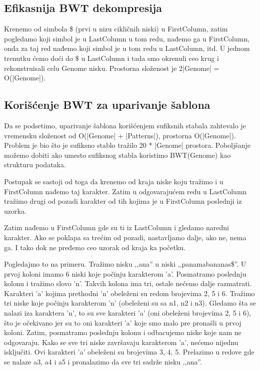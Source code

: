 \subsection{Efikasnija BWT dekompresija}

Krenemo od simbola \$ (prvi u nizu cikličnih niski) u FirstColumn, zatim pogledamo koji simbol je u LastColumn u tom redu, nađemo ga u FirstColumn, onda za taj red nađemo koji simbol je u tom redu u LastColumn, itd. U jednom trenutku ćemo doći do \$ u LastColumn i tada smo okrenuli ceo krug i rekonstruisali celu Genome nisku. Prostorna složenost je 2|Genome| = O(|Genome|).


\subsection{Korišćenje BWT za uparivanje šablona}

Da se podsetimo, uparivanje šablona korišćenjem sufiksnih stabala zahtevalo je vremensku složenost od O(|Genome| + |Patterns|), prostorna O(|Genome|). Problem je bio što je sufiksno stablo tražilo 20 * |Genome| prostora. Poboljšanje možemo dobiti ako umesto sufiksnog stabla koristimo BWT(Genome) kao strukturu podataka.

Postupak se sastoji od toga da krenemo od kraja niske koju tražimo i u FirstColumn nađemo taj karakter. Zatim u odgovarajućem redu u LastColumn tražimo drugi od pozadi karakter od tih kojima je u FirstColumn poslednji iz uzorka.

Zatim nađemo u FirstColumn gde su ti iz LastColumn i gledamo naredni karakter. Ako se poklapa sa trećim od pozadi, nastavljamo dalje, ako ne, nema ga. I tako dok ne pređemo ceo uzorak od kraja ka početku.

Pogledajmo to na primeru. Tražimo nisku ‚‚ana'' u niski ‚‚panamabananas\$''. U prvoj koloni imamo 6 niski koje počinju karakterom 'a'. Posmatramo poslednju kolonu i tražimo slovo 'n'. Takvih kolona ima tri, ostale nećemo dalje razmatrati. Karakteri 'a' kojima prethodni 'n' obeleženi su redom brojevima 2, 5 i 6. Tražimo tri niske koje počinju karakterom 'n' (obeleženi su sa n1, n2 i n3). Gledamo šta se nalazi iza karaktera 'n', to su sve karakteri 'a' (oni obeleženi brojevima 2, 5 i 6), što je očekivano jer su to oni karakteri 'a' koje smo malo pre pronašli u prvoj koloni. Zatim, posmatramo poslednju kolonu i odbacujemo niske koje nam ne odgovaraju. Kako se sve tri niske završavaju karakterom 'a', nećemo nijednu isključiti. Ovi karakteri 'a' obeleženi su brojevima 3, 4, 5. Prelazimo u redove gde se nalaze a3, a4 i a5 i pronalazimo da sve tri sadrže nisku ‚‚ana''. 

